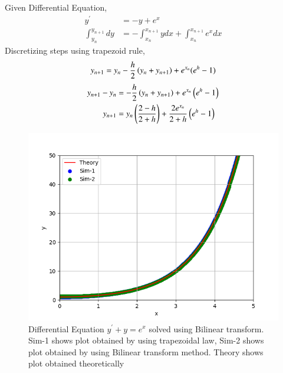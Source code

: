 \documentclass[journal]{IEEEtran}
\begin{document}
Given Differential Equation,
\begin{align}
  y^{\prime} &= -y + e^x \\
  \int_{y_n}^{y_{n+1}} dy &= -\int_{x_n}^{x_{n+1}} ydx +\int_{x_n}^{x_{n+1}} e^x dx  
\end{align}
Discretizing steps using trapezoid rule, 
\begin{align}
  y_{n+1} = y_n - \frac{h}{2}\left(y_n + y_{n+1}\right) + e^{x_n}(e^h-1)
\end{align}
\begin{align}
  y_{n+1} - y_n &= -\frac{h}{2}\left(y_n + y_{n+1}\right) + e^{x_n}\left(e^h-1\right)\\
  y_{n+1} &= y_n\left(\frac{2-h}{2+h}\right) + \frac{2e^{x_n}}{2+h}\left(e^h-1\right)
\end{align}
\begin{figure}[h!]
   \centering
   \includegraphics[width=1\columnwidth]{figs/fig.png}
   \caption{Differential Equation $y^{\prime}+y=e^x$ solved using Bilinear transform. Sim-1 shows plot obtained by using trapezoidal law, Sim-2 shows plot obtained by using Bilinear transform method. Theory shows plot obtained theoretically}
   \label{stemplot}
\end{figure}
\end{document}
